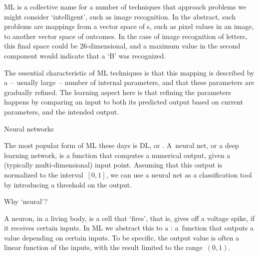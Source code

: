 

\acf{ML} is a collective name for a number of techniques that
approach problems we might consider `intelligent', such as image
recognition. In the abstract, such problems are mappings from a vector
space of s, such as pixel values in an image, to
another vector space of outcomes. In the case of image recognition of
letters, this final space could be 26-dimensional, and a maximum value
in the second component would indicate that a `B' was recognized.

The essential characteristic of \ac{ML} techniques is that
this mapping is described by a --~usually large~-- number of internal
parameters, and that these parameters are gradually refined. The
learning aspect here is that refining the parameters happens by
comparing an input to both its predicted output based on current
parameters, and the intended output.

 {Neural networks}


The most popular form of \ac{ML} these days is \acf{DL}, or
.
A~neural net, or a deep learning network, is a function that computes
a numerical output, given a (typically multi-dimensional) input point.
Assuming that this output is normalized to the interval~$[0,1]$, we
can use a neural net as a classification tool by introducing a threshold
on the output.

Why `neural'?

A neuron, in a living body, is a cell that `fires', that is, gives off
a voltage spike, if it receives certain inputs. In \ac{ML} we abstract
this to a : a~function that outputs a value
depending on certain inputs. To be specific, the output value is often
a linear function of the inputs, with the result
limited to the range~$(0,1)$.

